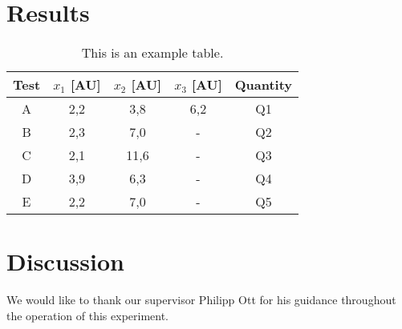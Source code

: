 \documentclass[twocolumn,
			   showpacs,%
               nofootinbib,
               aps,%
               eqsecnum,
               prd,
               notitlepage,
               showkeys,
               10pt]{revtex4-1}
\begin{document}
\section{Results}
\blindtext



\begin{table}[!htbp]
\centering
\setlength{\tabcolsep}{2mm}
\renewcommand{\arraystretch}{1.5}
\begin{tabular}{|c||c|c|c|c|}
\hline
Test & $x_1$ [AU] & $x_2$ [AU] & $x_3$ [AU] & Quantity \\ \hline \hline
A & 2,2 & 3,8 & 6,2 & Q1 \\
\hline
B & 2,3 & 7,0 & - & Q2 \\
\hline
C & 2,1 & 11,6 & - & Q3 \\
\hline
D & 3,9 & 6,3 & - & Q4\\
\hline
E & 2,2 & 7,0 & - & Q5 \\
\hline
\end{tabular}
\caption{\label{tab:test}This is an example table.}
\end{table}




\section{Discussion}

\Blindtext


\begin{acknowledgments}

We would like to thank our supervisor Philipp Ott for his guidance throughout the operation of this experiment.

\end{acknowledgments}




\nocite{*}
\end{document}
